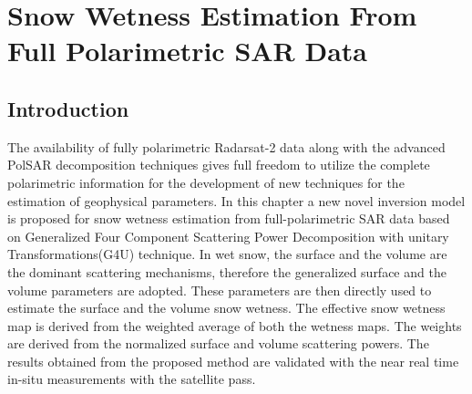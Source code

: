 \chapter{Snow Wetness Estimation From Full Polarimetric SAR Data}
\section{Introduction}

%

The availability of fully polarimetric Radarsat-2 data along with the advanced PolSAR decomposition techniques gives full freedom to utilize the complete polarimetric information for the development of new techniques for the estimation of geophysical parameters. In this chapter a new novel inversion model is proposed for snow wetness estimation from full-polarimetric SAR data based on Generalized Four Component Scattering Power Decomposition with unitary Transformations(G4U) technique.   
In wet snow, the surface and the volume are the dominant scattering mechanisms, therefore the generalized surface and the volume parameters are adopted. These parameters are then directly used to estimate the surface and the volume snow wetness. The effective snow wetness map is derived from the weighted average of both the wetness maps. The weights are derived from the normalized surface and volume scattering powers. The results obtained from the proposed method are validated with the near real time in-situ measurements with the satellite pass.

